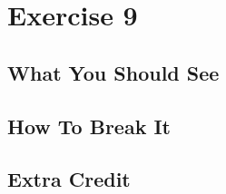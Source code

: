 \chapter{Exercise 9}


\section{What You Should See}


\section{How To Break It}


\section{Extra Credit}



